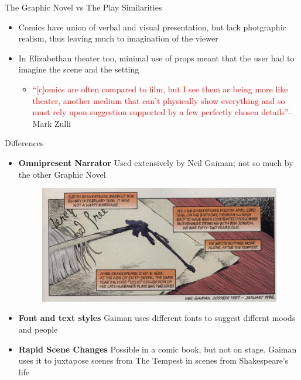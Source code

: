 \documentclass{beamer}
\begin{document}
  \begin{frame}[allowframebreaks]{The Graphic Novel vs The Play}
    Similarities
    \begin{itemize}
    \item Comics have union of verbal and visual presentation, but lack photgraphic realism, thus leaving much to imagination of the viewer
    \item In Elizabethan theater too, minimal use of props meant that the user had to imagine the scene and the setting

      \begin{itemize}
        \item \textcolor{red}{``[c]omics are often compared to film, but I see them as being more like theater, another medium that can't physically show everything and so must rely upon suggestion supported by a few perfectly chosen details''}--Mark Zulli ~\cite{sixcharacters}
      \end{itemize}
    \end{itemize}
    Differences
    \begin{itemize}
    \item \textbf{Omnipresent Narrator} Used extensively by Neil Gaiman; not so much by the other Graphic Novel
      \begin{figure}[htp]
        \begin{center}
          \centering
          \includegraphics[scale=0.35]{omnipresent.jpg}
        \end{center}
      \end{figure}
    \item \textbf{Font and text styles} Gaiman uses different fonts to suggest differnt moods and people
    \item \textbf{Rapid Scene Changes} Possible in a comic book, but not on stage. Gaiman uses it to juxtapose scenes from The Tempest in scenes from Shakespeare's life
    \end{itemize}
  \end{frame}
  
\end{document}

